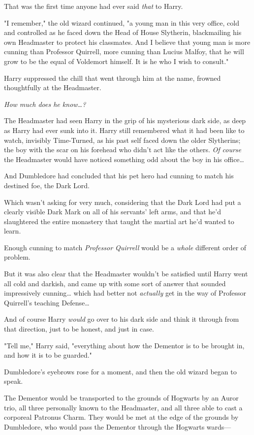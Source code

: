 That was the first time anyone had ever said \emph{that} to Harry.

"I remember," the old wizard continued, "a young man in this very office, cold 
and controlled as he faced down the Head of House Slytherin, blackmailing his 
own Headmaster to protect his classmates. And I believe that young man is more 
cunning than Professor Quirrell, more cunning than Lucius Malfoy, that he will 
grow to be the equal of Voldemort himself. It is he who I wish to consult."

Harry suppressed the chill that went through him at the name, frowned 
thoughtfully at the Headmaster.

\emph{How much does he know{\ldots}?}

The Headmaster had seen Harry in the grip of his mysterious dark side, as deep 
as Harry had ever sunk into it. Harry still remembered what it had been like to 
watch, invisibly Time-Turned, as his past self faced down the older Slytherins; 
the boy with the scar on his forehead who didn't act like the others. \emph{Of 
course} the Headmaster would have noticed something odd about the boy in his 
office{\ldots}

And Dumbledore had concluded that his pet hero had cunning to match his 
destined foe, the Dark Lord.

Which wasn't asking for very much, considering that the Dark Lord had put a 
clearly visible Dark Mark on all of his servants' left arms, and that he'd 
slaughtered the entire monastery that taught the martial art he'd wanted to 
learn.

Enough cunning to match \emph{Professor Quirrell} would be a \emph{whole} 
different order of problem.

But it was also clear that the Headmaster wouldn't be satisfied until Harry 
went all cold and darkish, and came up with some sort of answer that sounded 
impressively cunning{\ldots} which had better not \emph{actually} get in the 
way of Professor Quirrell's teaching Defense{\ldots}

And of course Harry \emph{would} go over to his dark side and think it through 
from that direction, just to be honest, and just in case.

"Tell me," Harry said, "everything about how the Dementor is to be brought in, 
and how it is to be guarded."

Dumbledore's eyebrows rose for a moment, and then the old wizard began to speak.

The Dementor would be transported to the grounds of Hogwarts by an Auror trio, 
all three personally known to the Headmaster, and all three able to cast a 
corporeal Patronus Charm. They would be met at the edge of the grounds by 
Dumbledore, who would pass the Dementor through the Hogwarts wards---

